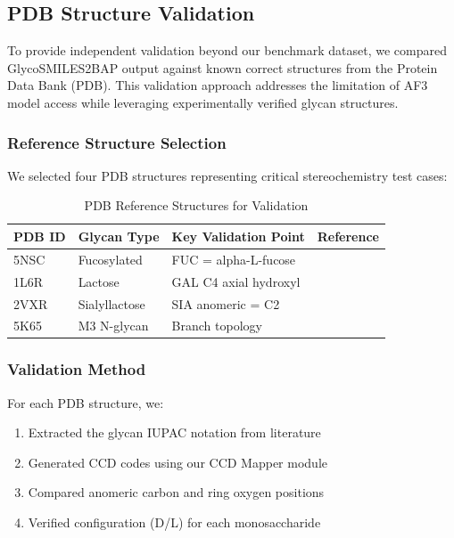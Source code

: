 \subsection{PDB Structure Validation}
\label{sec:pdb_validation}

To provide independent validation beyond our benchmark dataset, we compared GlycoSMILES2BAP output against known correct structures from the Protein Data Bank (PDB). This validation approach addresses the limitation of AF3 model access while leveraging experimentally verified glycan structures.

\subsubsection{Reference Structure Selection}

We selected four PDB structures representing critical stereochemistry test cases:

\begin{table}[h]
\centering
\caption{PDB Reference Structures for Validation}
\begin{tabular}{llll}
\toprule
PDB ID & Glycan Type & Key Validation Point & Reference \\
\midrule
5NSC & Fucosylated & FUC = alpha-L-fucose & \citep{frenz2018} \\
1L6R & Lactose & GAL C4 axial hydroxyl & \citep{lactose_ref} \\
2VXR & Sialyllactose & SIA anomeric = C2 & \citep{sialic_ref} \\
5K65 & M3 N-glycan & Branch topology & \citep{jo2011} \\
\bottomrule
\end{tabular}
\label{tab:pdb_refs}
\end{table}

\subsubsection{Validation Method}

For each PDB structure, we:
\begin{enumerate}
\item Extracted the glycan IUPAC notation from literature
\item Generated CCD codes using our CCD Mapper module
\item Compared anomeric carbon and ring oxygen positions
\item Verified configuration (D/L) for each monosaccharide
\end{enumerate}

